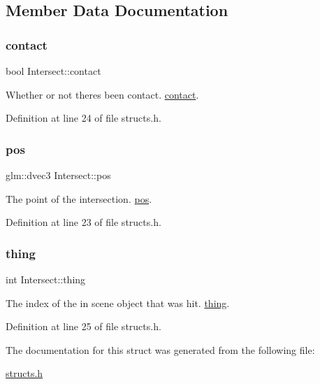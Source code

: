\subsection{Member Data Documentation}
\mbox{\label{struct_intersect_a804dc874077e6140a02aeddcfa992892}} 
\subsubsection{\texorpdfstring{contact}{contact}}
{\footnotesize\ttfamily bool Intersect\+::contact}



Whether or not there\textquotesingle{}s been contact. \mbox{\hyperlink{struct_intersect_a804dc874077e6140a02aeddcfa992892}{contact}}. 



Definition at line 24 of file structs.\+h.

\mbox{\label{struct_intersect_a3af8689bbf10550451c0512186727d03}} 
\subsubsection{\texorpdfstring{pos}{pos}}
{\footnotesize\ttfamily glm\+::dvec3 Intersect\+::pos}



The point of the intersection. \mbox{\hyperlink{struct_intersect_a3af8689bbf10550451c0512186727d03}{pos}}. 



Definition at line 23 of file structs.\+h.

\mbox{\label{struct_intersect_a0db00f51f704942fd24de64379a74c28}} 
\subsubsection{\texorpdfstring{thing}{thing}}
{\footnotesize\ttfamily int Intersect\+::thing}



The index of the in scene object that was hit. \mbox{\hyperlink{struct_intersect_a0db00f51f704942fd24de64379a74c28}{thing}}. 



Definition at line 25 of file structs.\+h.



The documentation for this struct was generated from the following file\+:\begin{DoxyCompactItemize}
\item 
\mbox{\hyperlink{structs_8h}{structs.\+h}}\end{DoxyCompactItemize}
